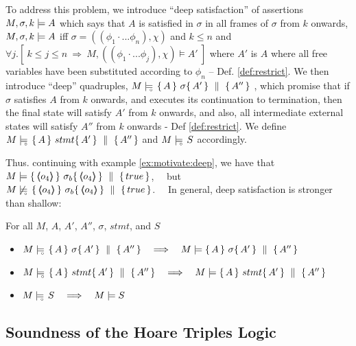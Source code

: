 To address this problem, we introduce ``deep satisfaction'' of assertions $ M,\sigma ,{k} \models {A} $ which says that $A$ is satisfied in $\sigma$  in all frames of $\sigma$ from $k$ onwards, 
\ie  $ M,\sigma ,{k} \models {A} $ iff $\sigma = ((\phi_1\cdot ... \phi_n), \chi)$ and $k\leq n$ and $\forall j. [\  k\leq j \leq n \ \Rightarrow \ M, ((\phi_1\cdot ... \phi_j), \chi) \models A'\ ]$ where $A'$ is $A$ where all free variables have been substituted according to $\phi_n$ -- \cf Def. \ref{def:restrict}.
We then introduce ``deep'' quadruples,   $M \models\!\!\!\!_{_{\circ}}\   \{\, A \, \}\ \sigma \{\, A' \, \} \, \,\parallel\,\, \{\, A'' \, \} $ , which promise that if $\sigma$ satisfies $A$ from $k$ onwards, and executes its continuation to termination, then the final state will satisfy $A'$ from $k$ onwards, and also, all intermediate external states will satisfy $A''$ from $k$ onwards - \cf Def \ref{def:restrict}.
We define   $M \models\!\!\!\!_{_{\circ}}\   \{\, A \, \}\ stmt \{\, A' \, \} \, \,\parallel\,\, \{\, A'' \, \}  $ and  $M \models\!\!\!\!_{_{\circ}}\  S $ accordingly.


Thus. continuing with example \ref{ex:motivate:deep},  we have that\ \  $\satisfies {M} {\quadruple   {\inside {o_4}} }   {\sigma_b}   {\inside {o_4}}  {true} $, \ \ 
 but \\ $\notSatisfiesD {M}   {\quadruple   {\inside {o_4}} }  {\sigma_b}   {\inside {o_4}}  {true}  $.
\ \  In general, deep satisfaction is stronger than shallow:   
 
\begin{lemma}
For all $M$, $A$, $A'$, $A''$, $\sigma$, $stmt$, and $S$
\begin{itemize}
\item
 $M \models\!\!\!\!_{_{\circ}}\   \{\, A \, \}\ \sigma \{\, A' \, \} \, \,\parallel\,\, \{\, A'' \, \}    \ \ \ \Longrightarrow \ \ \   M \models  \{\, A \, \}\ \sigma \{\, A' \, \} \, \,\parallel\,\, \{\, A'' \, \} $

\item
 $M \models\!\!\!\!_{_{\circ}}\   \{\, A \, \}\ stmt \{\, A' \, \} \, \,\parallel\,\, \{\, A'' \, \}    \ \ \ \Longrightarrow \ \ \   M \models  \{\, A \, \}\ stmt \{\, A' \, \} \, \,\parallel\,\, \{\, A'' \, \} $
\item 
$\satisfiesD {M} {S}  \ \ \ \Longrightarrow \ \ \ \satisfies {M} {S}$
\end{itemize}
\end{lemma}



 

\subsection{Soundness of the Hoare Triples Logic}


